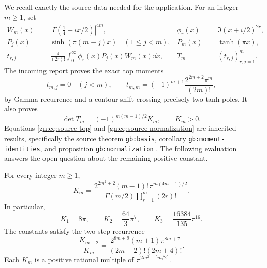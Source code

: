 We recall exactly the source data needed for the application.  For an
integer $m\ge1$, set
\begin{align}
 W_m(x)&=|\Gamma(\tfrac14+ix/2)|^{4m},
       &\phi_r(x)&=\Im(x+i/2)^{2r},\label{gn:eq:source-weight}\\
 P_j(x)&=\sinh(\pi(m-j)x)\quad(1\le j<m),
       &P_m(x)&=\tanh(\pi x),\label{gn:eq:source-multipliers}\\
 t_{r,j}&=\frac4{(2r)!}\int_0^\infty
                 \phi_r(x)P_j(x)W_m(x)\dd x,
       &T_m&=(t_{r,j})_{r,j=1}^m.\label{gn:eq:source-matrix}
\end{align}
The incoming report proves the exact top moments
\begin{equation}\label{gn:eq:source-top}
 t_{m,j}=0\quad(j<m),\qquad
 t_{m,m}=(-1)^{m+1}\frac{2^{2m+2}\pi^m}{(2m)!},
\end{equation}
by Gamma recurrence and a contour shift crossing precisely two tanh
poles.  It also proves
\begin{equation}\label{gn:eq:source-normalization}
 \det T_m=(-1)^{m(m-1)/2}K_m,\qquad K_m>0.
\end{equation}
Equations \eqref{gn:eq:source-top} and
\eqref{gn:eq:source-normalization} are inherited results, specifically
the source theorem \texttt{gb:basis}, corollary
\texttt{gb:moment-identities}, and proposition
\texttt{gb:normalization} \cite{repoordered}.  The following evaluation
answers the open question about the remaining positive constant.

\begin{theorem}
\label{gn:thm:K}
For every integer $m\ge1$,
\begin{equation}\label{gn:eq:K}
 \boxed{\displaystyle
 K_m=\frac{2^{2m^2+2}(m-1)!\,\pi^{m(4m-1)/2}}
              {\Gamma(m/2)\prod_{r=1}^m(2r)!}.}
\end{equation}
In particular,
\begin{equation}\label{gn:eq:K-values}
 K_1=8\pi,\qquad
 K_2=\frac{64}{3}\pi^7,\qquad
 K_3=\frac{16384}{135}\pi^{16}.
\end{equation}
The constants satisfy the two-step recurrence
\begin{equation}\label{gn:eq:K-recurrence}
 \boxed{\displaystyle
 \frac{K_{m+2}}{K_m}
   =\frac{2^{8m+9}(m+1)\pi^{8m+7}}
              {(2m+2)!(2m+4)!}.}
\end{equation}
Each $K_m$ is a positive rational multiple of
$\pi^{2m^2-\lceil m/2\rceil}$.
\end{theorem}

